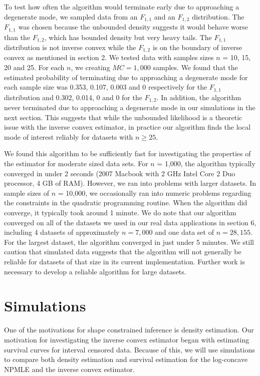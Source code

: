\documentclass[11pt]{article}
\numberwithin{equation}{section}
\begin{document}
	To test how often the algorithm would terminate early due to approaching a degenerate mode, we sampled data from an $F_{1,1}$ and an $F_{1,2}$ distribution. The $F_{1,1}$ was chosen because the unbounded density suggests it would behave worse than the $F_{1,2}$, which has bounded density but very heavy tails. The $F_{1,1}$ distribution is not inverse convex while the $F_{1,2}$ is on the boundary of inverse convex as mentioned in section 2. We tested data with samples sizes $n$ = 10, 15, 20 and 25. For each $n$, we creating $MC = 1,000$ samples. We found that the estimated probability of terminating due to approaching a degenerate mode for each sample size was 0.353, 0.107, 0.003 and 0 respectively for the $F_{1,1}$ distribution and 0.302, 0.014, 0 and 0 for the $F_{1,2}$. In addition, the algorithm never terminated due to approaching a degenerate mode in our simulations in the next section. This suggests that while the unbounded likelihood is a theoretic issue with the inverse convex estimator, in practice our algorithm finds the local mode of interest reliably for datasets with $n \geq 25$. 
	
	We found this algorithm to be sufficiently fast for investigating the properties of the estimator for moderate sized data sets. For $n$ = 1,000, the algorithm typically converged in under 2 seconds (2007 Macbook with 2 GHz Intel Core 2 Duo processor, 4 GB of RAM). However, we ran into problems with larger datasets. In sample sizes of $n$ = 10,000,  we occasionally ran into numeric problems regarding the constraints in the quadratic programming routine. When the algorithm did converge, it typically took around 1 minute. We do note that our algorithm converged on all of the datasets we used in our real data applications in section 6, including 4 datasets of approximately $n = 7,000$ and one data set of $n = 28,155$. For the largest dataset, the algorithm converged in just under 5 minutes. We still caution that simulated data suggests that the algorithm will not generally be reliable for datasets of that size in its current implementation. Further work is necessary to develop a reliable algorithm for large datasets.
	
{\section{Simulations} } 

	One of the motivations for shape constrained inference is density estimation. Our motivation for investigating the inverse convex estimator began with estimating survival curves for interval censored data. Because of this, we will use simulations to compare both density estimation and survival estimation for the log-concave NPMLE and the inverse convex estimator. 
	
\end{document}
